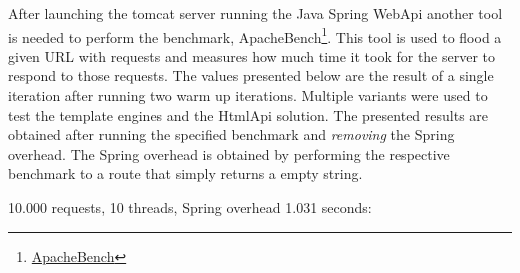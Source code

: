\noindent
After launching the tomcat server running the Java Spring WebApi another tool is needed to perform the benchmark, ApacheBench\footnote{\href{https://httpd.apache.org/docs/2.4/programs/ab.html}{ApacheBench}}. This tool is used to flood a given \ac{URL} with requests and measures how much time it took for the server to respond to those requests. The values presented below are the result of a single iteration after running two warm up iterations. Multiple variants were used to test the template engines and the HtmlApi solution. The presented results are obtained after running the specified benchmark and \textit{removing} the Spring overhead. The Spring overhead is obtained by performing the respective benchmark to a route that simply returns a empty string.

10.000 requests, 10 threads, Spring overhead 1.031 seconds:

